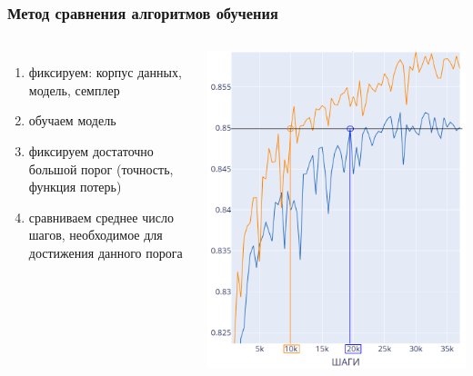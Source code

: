 \documentclass{beamer}
\begin{document}
\begin{frame}
	\frametitle{Метод сравнения алгоритмов обучения}
	\begin{columns}
		\begin{enumerate}
			\item фиксируем: корпус данных, модель, семплер
			\item обучаем модель
			\item фиксируем достаточно большой порог (точность, функция потерь)
			\item сравниваем среднее число шагов, необходимое для достижения данного порога
		\end{enumerate}
		\includegraphics[scale=0.25]{compare}
	\end{columns}
\end{frame}
\end{document}
